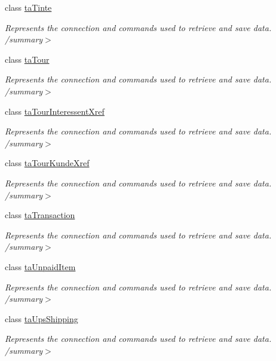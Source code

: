 \begin{DoxyCompactItemize}
class \hyperlink{class_products_1_1_data_1_1ds_sage_table_adapters_1_1ta_tinte}{ta\+Tinte}
\begin{DoxyCompactList}\small\item\em Represents the connection and commands used to retrieve and save data. /summary$>$ \end{DoxyCompactList}\item 
class \hyperlink{class_products_1_1_data_1_1ds_sage_table_adapters_1_1ta_tour}{ta\+Tour}
\begin{DoxyCompactList}\small\item\em Represents the connection and commands used to retrieve and save data. /summary$>$ \end{DoxyCompactList}\item 
class \hyperlink{class_products_1_1_data_1_1ds_sage_table_adapters_1_1ta_tour_interessent_xref}{ta\+Tour\+Interessent\+Xref}
\begin{DoxyCompactList}\small\item\em Represents the connection and commands used to retrieve and save data. /summary$>$ \end{DoxyCompactList}\item 
class \hyperlink{class_products_1_1_data_1_1ds_sage_table_adapters_1_1ta_tour_kunde_xref}{ta\+Tour\+Kunde\+Xref}
\begin{DoxyCompactList}\small\item\em Represents the connection and commands used to retrieve and save data. /summary$>$ \end{DoxyCompactList}\item 
class \hyperlink{class_products_1_1_data_1_1ds_sage_table_adapters_1_1ta_transaction}{ta\+Transaction}
\begin{DoxyCompactList}\small\item\em Represents the connection and commands used to retrieve and save data. /summary$>$ \end{DoxyCompactList}\item 
class \hyperlink{class_products_1_1_data_1_1ds_sage_table_adapters_1_1ta_unpaid_item}{ta\+Unpaid\+Item}
\begin{DoxyCompactList}\small\item\em Represents the connection and commands used to retrieve and save data. /summary$>$ \end{DoxyCompactList}\item 
class \hyperlink{class_products_1_1_data_1_1ds_sage_table_adapters_1_1ta_ups_shipping}{ta\+Ups\+Shipping}
\begin{DoxyCompactList}\small\item\em Represents the connection and commands used to retrieve and save data. /summary$>$ \end{DoxyCompactList}\item 

\end{DoxyCompactItemize}
